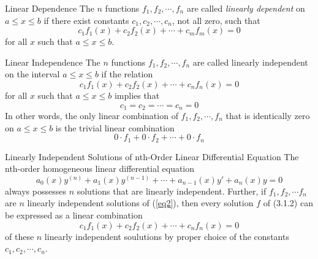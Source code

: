 \begin{definition}{Linear Dependence}{}
    The $n$ functions $f_1, f_2, \cdots, f_n$ are called \textit{linearly dependent} on $a \le x \le b$ if there exist constants $c_1, c_2, \cdots, c_n$, not all zero, such that \[
        c_1f_1(x) + c_2f_2(x) + \cdots + c_mf_m(x) = 0
    \] for all $x$ such that $a \le x \le b$.
\end{definition}

\begin{definition}{Linear Independence}{}
    The $n$ functions $f_1, f_2, \cdots, f_n$ are called linearly independent on the interval $a \le x \le b$ if the relation \[
        c_1f_1(x) + c_2f_2(x) + \cdots + c_nf_n(x) = 0
    \] for all $x$ such that $a \le x \le b$ implies that \[
        c_1 = c_2 = \cdots = c_n = 0
    \] In other words, the only linear combination of $f_1, f_2, \cdots, f_n$ that is identically zero on $a \le x \le b$ is the trivial linear combination \[
    0\cdot f_1 + 0\cdot f_2 + \cdots + 0\cdot f_n
    \]
\end{definition}

\begin{theorem}{Linearly Independent Solutions of nth-Order Linear Differential Equation}{}
    The nth-order homogeneous linear differential equation
    \begin{equation}\tag{3.1.2}
        a_0(x)y^{(n)} + a_1(x)y^{(n-1)} + \cdots + a_{n-1}(x)y' + a_n(x)y = 0
    \end{equation}
    always possesses $n$ solutions that are linearly independent. Further, if $f_1, f_2, \cdots f_n$ are $n$ linearly independent solutions of (\ref{eq2}), then every solution $f$ of (3.1.2) can be expressed as a linear combination \[
        c_1f_1(x) + c_2f_2(x) + \cdots + c_nf_n(x) = 0
    \] of these $n$ linearly independent soulutions by proper choice of the constants $c_1, c_2, \cdots, c_n$.
\end{theorem}

